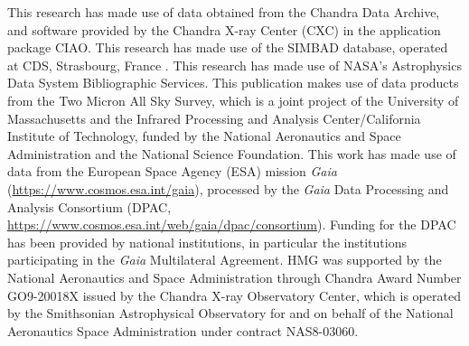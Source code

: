 \documentclass[preprint2]{aastex631}
\begin{document}
\begin{acknowledgements}

This research has made use of data obtained from the Chandra Data Archive, and software provided by the Chandra X-ray Center (CXC) in the application package CIAO.
This research has made use of the SIMBAD database,
operated at CDS, Strasbourg, France \citep{2000A&AS..143....9W}. 
This research has made use of NASA’s Astrophysics Data System Bibliographic Services.
This publication makes use of data products from the Two Micron All Sky Survey, which is a joint project of the University of Massachusetts and the Infrared Processing and Analysis Center/California Institute of Technology, funded by the National Aeronautics and Space Administration and the National Science Foundation.
This work has made use of data from the European Space Agency (ESA) mission
{\it Gaia} (\url{https://www.cosmos.esa.int/gaia}), processed by the {\it Gaia}
Data Processing and Analysis Consortium (DPAC,
\url{https://www.cosmos.esa.int/web/gaia/dpac/consortium}). Funding for the DPAC
has been provided by national institutions, in particular the institutions
participating in the {\it Gaia} Multilateral Agreement.
HMG was supported by the National Aeronautics and Space Administration through Chandra Award Number GO9-20018X issued by the Chandra X-ray Observatory Center, which is operated by the Smithsonian Astrophysical Observatory for and on behalf of the National Aeronautics Space Administration under contract NAS8-03060.
\end{acknowledgements}



{}



\end{document}
